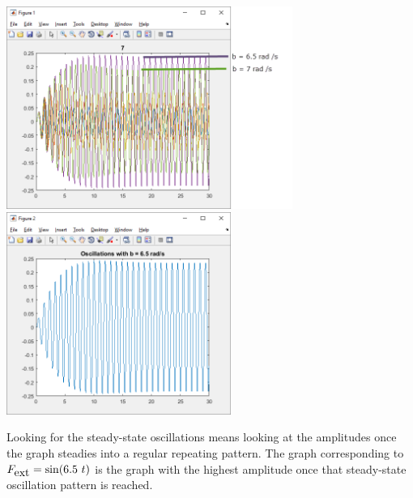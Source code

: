 \begin{enumerate}
\begin{Solution}
\begin{center}
\includegraphics[height=2.6in]{graphics/Week08_Spring/W08DampedAndForced1}
\includegraphics[height=2.6in]{graphics/Week08_Spring/W08DampedAndForced2}
\end{center}

Looking for the steady-state oscillations means looking at the
amplitudes once the graph steadies into a regular repeating pattern.
The graph corresponding to $F_{\mbox{ext}} = \sin(6.5~t)$ is the graph with the
highest amplitude once that steady-state oscillation pattern is
reached.


 \end{Solution}

\end{enumerate}






